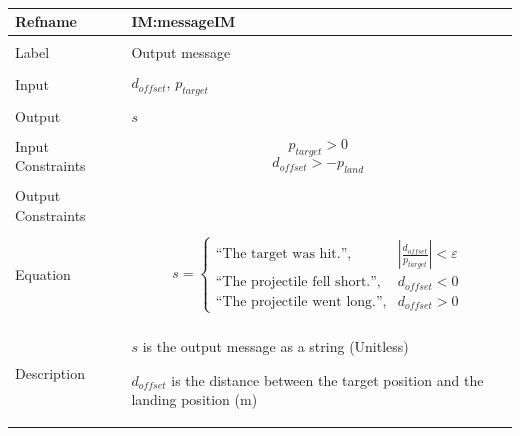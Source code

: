 \documentclass[12pt]{article}
\begin{document}
\par~

\noindent \begin{minipage}{\textwidth}
          \begin{tabular}{>{\raggedright}p{}>{\raggedright\arraybackslash}p{}}
          \toprule \textbf{Refname} & \textbf{IM:messageIM}
          \label{IM:messageIM}
          \\ \midrule \\
          Label & Output message
          \\ \midrule \\
          Input & ${d_{offset}}$, ${p_{target}}$
          \\ \midrule \\
          Output & $s$
          \\ \midrule \\
          Input Constraints & \begin{displaymath}
                              {p_{target}}>0
                              \end{displaymath}
                              \begin{displaymath}
                              {d_{offset}}>-{p_{land}}
                              \end{displaymath}
          \\ \midrule \\
          Output Constraints & 
          \\ \midrule \\
          Equation & \begin{displaymath}
                     s=\begin{cases}
                       \text{``The target was hit.''}, & |\frac{{d_{offset}}}{{p_{target}}}|<ε\\
\text{``The projectile fell short.''}, & {d_{offset}}<0\\
\text{``The projectile went long.''}, & {d_{offset}}>0
                       \end{cases}
                     \end{displaymath}
          \\ \midrule \\
          Description & \begin{symbDescription}
                        \item{$s$ is the output message as a string (Unitless)}
                        \item{${d_{offset}}$ is the distance between the target position and the landing position (m)}

\end{symbDescription}
\end{tabular}
\end{minipage}
\end{document}
